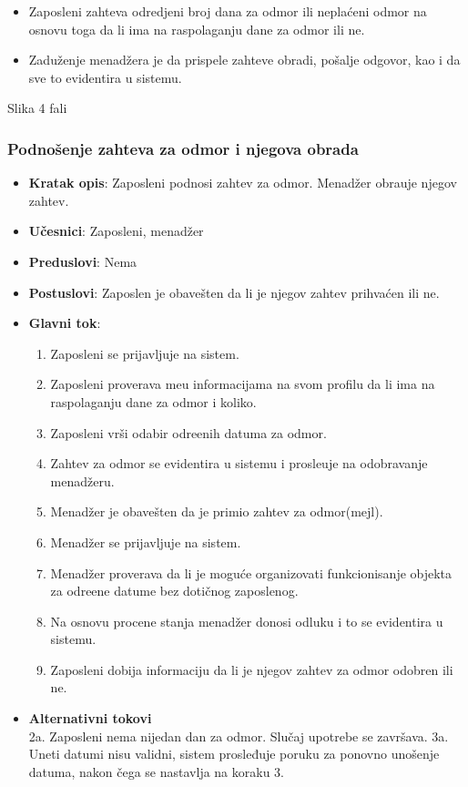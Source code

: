  
 \begin{itemize}
     \item Zaposleni zahteva odredjeni broj dana za odmor ili nepla\' ceni odmor na osnovu toga da li ima na raspolaganju dane za odmor ili ne.
     \item Zadu\v zenje menad\v zera je da prispele zahteve obradi, po\v salje odgovor, kao i da sve to evidentira u sistemu.
 \end{itemize}
 Slika 4 fali
 
  \subsubsection{Podno\v senje zahteva za odmor i njegova obrada }
 \begin{itemize}
    \item \textbf{Kratak opis}:
   Zaposleni podnosi zahtev za odmor. Menad\v zer obra\dj uje njegov zahtev.
    \item \textbf{Učesnici}:
    Zaposleni, menad\v zer
    \item \textbf{Preduslovi}: Nema
    \item \textbf{Postuslovi}:
    Zaposlen je obave\v sten da li je njegov zahtev prihva\'cen ili ne.
    \item \textbf{Glavni tok}:
    \begin{enumerate}
        \item Zaposleni se prijavljuje na sistem.
        \item Zaposleni proverava me\dj u informacijama na svom profilu da li ima na raspolaganju dane za odmor i koliko.
        \item Zaposleni vr\v si odabir odre\dj enih datuma za odmor.
        \item Zahtev za odmor se evidentira u sistemu i prosle\dj uje na odobravanje menad\v zeru.
        \item Menad\v zer je obave\v sten da je primio zahtev za odmor(mejl).
        \item Menad\v zer se prijavljuje na sistem.
        \item Menad\v zer proverava da li je moguće organizovati funkcionisanje objekta za odre\dj ene datume bez dotičnog zaposlenog.
        \item Na osnovu procene stanja menad\v zer donosi odluku i to se evidentira u sistemu.
        \item Zaposleni dobija informaciju da li je njegov zahtev za odmor odobren ili ne.
    \end{enumerate}
\item \textbf{Alternativni tokovi}\\
        2a. Zaposleni nema nijedan dan za odmor. Slu\v caj upotrebe se zavr\v sava.
        3a. Uneti datumi nisu validni, sistem prosleđuje poruku za ponovno unošenje datuma, nakon čega se nastavlja na koraku 3.
 

\end{itemize}

